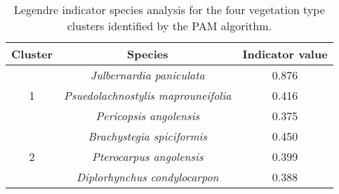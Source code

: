 \begin{table}[H]
\centering
\begin{tabular}{ccc}
  \hline
Cluster & Species & Indicator value \\ 
  \hline
\multirow{3}{*}{1} & \textit{Julbernardia paniculata} & 0.876 \\ 
& \textit{Psuedolachnostylis maprouneifolia} & 0.416 \\ 
& \textit{Pericopsis angolensis} & 0.375 \\ 
   \hline
\multirow{3}{*}{2} & \textit{Brachystegia spiciformis} & 0.450 \\ 
& \textit{Pterocarpus angolensis} & 0.399 \\ 
& \textit{Diplorhynchus condylocarpon} & 0.388 \\ 
  \end{tabular}
\caption{Legendre indicator species analysis for the four vegetation type clusters identified by the PAM algorithm.} 
\label{indval}
\end{table}

